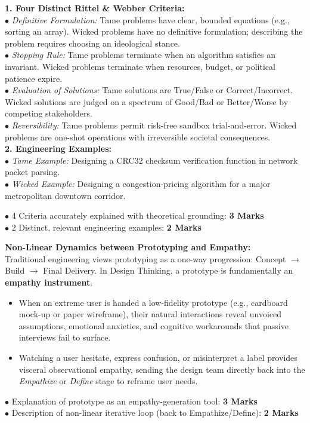 \begin{solutionbox}
\textbf{1. Four Distinct Rittel \& Webber Criteria:}\\
$\bullet$ \textit{Definitive Formulation:} Tame problems have clear, bounded equations (e.g., sorting an array). Wicked problems have no definitive formulation; describing the problem requires choosing an ideological stance.\\
$\bullet$ \textit{Stopping Rule:} Tame problems terminate when an algorithm satisfies an invariant. Wicked problems terminate when resources, budget, or political patience expire.\\
$\bullet$ \textit{Evaluation of Solutions:} Tame solutions are True/False or Correct/Incorrect. Wicked solutions are judged on a spectrum of Good/Bad or Better/Worse by competing stakeholders.\\
$\bullet$ \textit{Reversibility:} Tame problems permit risk-free sandbox trial-and-error. Wicked problems are one-shot operations with irreversible societal consequences.\\
\textbf{2. Engineering Examples:}\\
$\bullet$ \textit{Tame Example:} Designing a CRC32 checksum verification function in network packet parsing.\\
$\bullet$ \textit{Wicked Example:} Designing a congestion-pricing algorithm for a major metropolitan downtown corridor.
\begin{markingrubric}
$\bullet$ 4 Criteria accurately explained with theoretical grounding: \textbf{3 Marks}\\
$\bullet$ 2 Distinct, relevant engineering examples: \textbf{2 Marks}
\end{markingrubric}
\end{solutionbox}

\begin{solutionbox}
\textbf{Non-Linear Dynamics between Prototyping and Empathy:}\\
Traditional engineering views prototyping as a one-way progression: Concept $\to$ Build $\to$ Final Delivery. In Design Thinking, a prototype is fundamentally an \textbf{empathy instrument}.
\begin{itemize}
    \item When an extreme user is handed a low-fidelity prototype (e.g., cardboard mock-up or paper wireframe), their natural interactions reveal unvoiced assumptions, emotional anxieties, and cognitive workarounds that passive interviews fail to surface.
    \item Watching a user hesitate, express confusion, or misinterpret a label provides visceral observational empathy, sending the design team directly back into the \textit{Empathize} or \textit{Define} stage to reframe user needs.
\end{itemize}
\begin{markingrubric}
$\bullet$ Explanation of prototype as an empathy-generation tool: \textbf{3 Marks}\\
$\bullet$ Description of non-linear iterative loop (back to Empathize/Define): \textbf{2 Marks}
\end{markingrubric}
\end{solutionbox}

